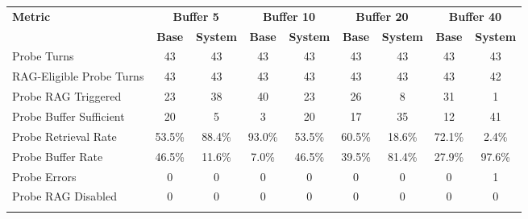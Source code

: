 \documentclass[pdflatex,sn-mathphys-num]{sn-jnl}%
\theoremstyle{thmstyleone}%
\theoremstyle{thmstyletwo}%
\theoremstyle{thmstylethree}%
\begin{document}
\begin{appendices}
\begin{landscape}
\begin{longtable}{@{}p{3.8cm}cccccccc@{}}
\toprule
\textbf{Metric} & \multicolumn{2}{c}{\textbf{Buffer 5}} & \multicolumn{2}{c}{\textbf{Buffer 10}} & \multicolumn{2}{c}{\textbf{Buffer 20}} & \multicolumn{2}{c}{\textbf{Buffer 40}} \\
\cmidrule(lr){2-3}\cmidrule(lr){4-5}\cmidrule(lr){6-7}\cmidrule(lr){8-9}
 & \textbf{Base} & \textbf{System} & \textbf{Base} & \textbf{System} & \textbf{Base} & \textbf{System} & \textbf{Base} & \textbf{System} \\
\midrule
\endhead
Probe Turns & 43 & 43 & 43 & 43 & 43 & 43 & 43 & 43 \\
RAG-Eligible Probe Turns & 43 & 43 & 43 & 43 & 43 & 43 & 43 & 42 \\
Probe RAG Triggered & 23 & 38 & 40 & 23 & 26 & 8 & 31 & 1 \\
Probe Buffer Sufficient & 20 & 5 & 3 & 20 & 17 & 35 & 12 & 41 \\
Probe Retrieval Rate & 53.5\% & 88.4\% & 93.0\% & 53.5\% & 60.5\% & 18.6\% & 72.1\% & 2.4\% \\
Probe Buffer Rate & 46.5\% & 11.6\% & 7.0\% & 46.5\% & 39.5\% & 81.4\% & 27.9\% & 97.6\% \\
Probe Errors & 0 & 0 & 0 & 0 & 0 & 0 & 0 & 1 \\
Probe RAG Disabled & 0 & 0 & 0 & 0 & 0 & 0 & 0 & 0 \\
\botrule
\end{longtable}
\normalsize
\end{landscape}

\end{appendices}


\end{document}
